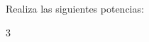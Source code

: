 \documentclass[12pt,addpoints,answers]{evalua}
\begin{document}
\begin{questions}

    \question[6] Realiza las siguientes potencias:

    \begin{multicols}{3}
    \end{multicols}


\end{questions}
\end{document}
